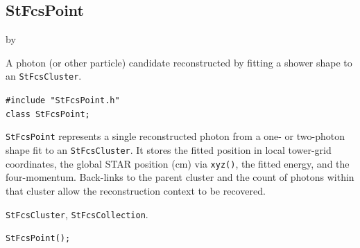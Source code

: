 \documentclass[twoside]{article}
\newcommand{\entrylabel}[1]{\mbox{\textbf{{#1}}}\hfil}%
\newenvironment{entry}
{\begin{list}{}%
    {\renewcommand{\makelabel}{\entrylabel}%
     \setlength{\labelwidth}{90pt}%
     \setlength{\leftmargin}{\labelwidth}
     \advance\leftmargin by \labelsep%
      }%
    }%
  {\end{list}}
\newcommand{\Entrylabel}[1]%
{\raisebox{0pt}[1ex][0pt]{\makebox[\labelwidth][l]%
    {\parbox[t]{\labelwidth}{\hspace{0pt}\textbf{{#1}}}}}}
\newenvironment{Entry}%
{\renewcommand{\entrylabel}{\Entrylabel}\begin{entry}}%
  {\end{entry}}
\begin{document}
\subsection{StFcsPoint}
\label{sec:StFcsPoint}
\begin{Entry}
\item[Summary]
    A photon (or other particle) candidate reconstructed by fitting a shower
    shape to an \texttt{StFcsCluster}.

\item[Synopsis]
    \verb+#include "StFcsPoint.h"+\\
    \verb+class StFcsPoint;+\\

\item[Description]
    \texttt{StFcsPoint} represents a single reconstructed photon from a
    one- or two-photon shape fit to an \texttt{StFcsCluster}.  It stores
    the fitted position in local tower-grid coordinates, the global STAR
    position (cm) via \texttt{xyz()}, the fitted energy, and the
    four-momentum.  Back-links to the parent cluster and the count of
    photons within that cluster allow the reconstruction context to be
    recovered.

\item[Related Classes]
    \texttt{StFcsCluster}, \texttt{StFcsCollection}.

\item[Public\\ Constructors]
    \verb+StFcsPoint();+\\


\end{Entry}
\end{document}
